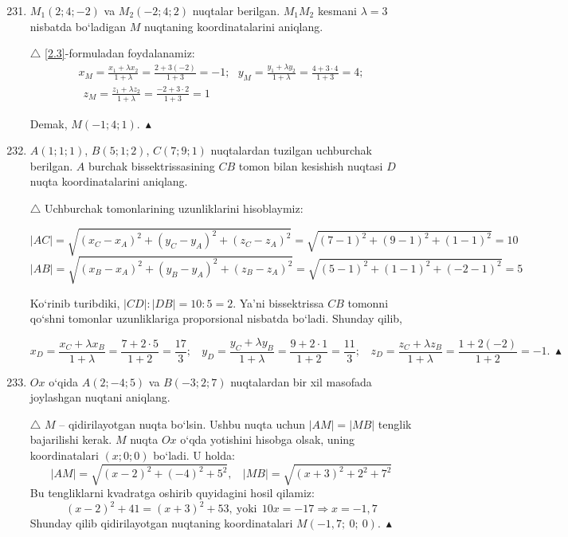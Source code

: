 \begin{enumerate} \setcounter{enumi}{230}
	
	\item $M_1(2; 4; -2)$ va $M_2(-2; 4; 2)$ nuqtalar berilgan. $M_1M_2$ kesmani  $\lambda=3$ nisbatda bo`ladigan $M$ nuqtaning koordinatalarini aniqlang. 
	
	$\triangle$ \eqref{2.3}-formuladan foydalanamiz:
	\begin{multline*}
		x_M=\frac{x_1+\lambda x_2}{1+\lambda}=\frac{2+3(-2)}{1+3}=-1;\ \ \ y_M=\frac{y_1+\lambda y_2}{1+\lambda}=\frac{4+3\cdot4}{1+3}=4;\\ \ \ z_M=\frac{z_1+\lambda z_2}{1+\lambda}=\frac{-2+3\cdot2}{1+3}=1
	\end{multline*}
	
	Demak, $M(-1;4;1).\ \blacktriangle$
	
	\item $A(1;1;1)$, $B(5;1;2)$, $C(7;9;1)$  nuqtalardan tuzilgan uchburchak berilgan. $A$ burchak bissektrissasining $CB$ tomon bilan kesishish nuqtasi $D$ nuqta koordinatalarini aniqlang.
	
	$\triangle$ Uchburchak tomonlarining uzunliklarini hisoblaymiz:
	
	$$|AC|=\sqrt{(x_C-x_A)^2+(y_C-y_A)^2+(z_C-z_A)^2}=\sqrt{(7-1)^2+(9-1)^2+(1-1)^2}=10$$
	$$|AB|=\sqrt{(x_B-x_A)^2+(y_B-y_A)^2+(z_B-z_A)^2}=\sqrt{(5-1)^2+(1-1)^2+(-2-1)^2}=5$$
	
	Ko`rinib turibdiki, $|CD|:|DB|=10:5=2$. Ya'ni bissektrissa $CB$ tomonni qo`shni tomonlar uzunliklariga proporsional nisbatda bo`ladi. Shunday qilib, 
	
	$$x_D=\frac{x_C+\lambda x_B}{1+\lambda}=\frac{7+2\cdot5}{1+2}=\frac{17}{3};\ \ \ \ y_D=\frac{y_C+\lambda y_B}{1+\lambda}=\frac{9+2\cdot1}{1+2}=\frac{11}{3};\ \ \ \ z_D=\frac{z_C+\lambda z_B}{1+\lambda}=\frac{1+2(-2)}{1+2}=-1.\ \blacktriangle$$
	
	\item $Ox$ o`qida $A(2;-4;5)$ va $B(-3;2;7)$ nuqtalardan bir xil masofada joylashgan nuqtani aniqlang.
	
	$\triangle$ $M$ -- qidirilayotgan nuqta bo`lsin. Ushbu nuqta uchun $|AM|=|MB|$ tenglik bajarilishi kerak. $M$ nuqta $Ox$ o`qda yotishini hisobga olsak, uning koordinatalari $(x;0;0)$ bo`ladi. U holda:
	$$|AM|=\sqrt{(x-2)^2+(-4)^2+5^2},\ \ \ \ |MB|=\sqrt{(x+3)^2+2^2+7^2}$$
	Bu tengliklarni kvadratga oshirib quyidagini hosil qilamiz:
	$$(x-2)^2+41=(x+3)^2+53,\ \mbox{yoki}\ \ 10x=-17\Rightarrow x=-1,7$$
	Shunday qilib qidirilayotgan nuqtaning koordinatalari $M(-1,7;\ 0;\ 0).\ \blacktriangle$
	

\end{enumerate}
